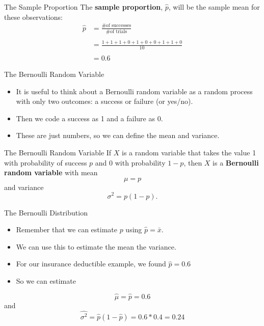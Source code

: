 \begin{frame}{The Sample Proportion}
    The \textbf{sample proportion}, $\hat{p}$, will be the sample mean for these observations:
    \begin{align*}
        \hat{p} &= \frac{\text{\# of successes}}{\text{\# of trials}} \\
        \\
        &= \frac{1 + 1 + 1 + 0 + 1 + 0 + 0 + 1 + 1 + 0 }{10} \\
        \\
        &= 0.6
    \end{align*}
\end{frame}

\begin{frame}{The Bernoulli Random Variable}
    \begin{itemize}
        \item It is useful to think about a Bernoulli random variable as a random process with only two outcomes: a success or failure (or yes/no). 
        \item Then we code a success as 1 and a failure as 0.
        \item These are just numbers, so we can define the mean and variance.
    \end{itemize}
\end{frame}

\begin{frame}{The Bernoulli Random Variable}
    If $X$ is a random variable that takes the value 1 with probability of success $p$ and 0 with probability $1 − p$, then $X$ is a \textbf{Bernoulli random variable} with mean 
    \[
        \mu = p
    \]
    and variance
    \[
        \sigma^2 = p(1-p).
    \]
\end{frame}

\begin{frame}{The Bernoulli Distribution}
    \begin{itemize}
        \item Remember that we can estimate $p$ using $\hat{p}=\bar{x}$.
        \item We can use this to estimate the mean the variance.
        \item For our insurance deductible example, we found $\hat{p}=0.6$
        \item So we can estimate 
            
    \end{itemize}
    \[
        \hat{\mu} = \hat{p} = 0.6
    \]
    \hspace{1cm} and
    \[
        \hat{\sigma^2} = \hat{p}(1-\hat{p}) = 0.6*0.4 = 0.24
    \]
\end{frame}

